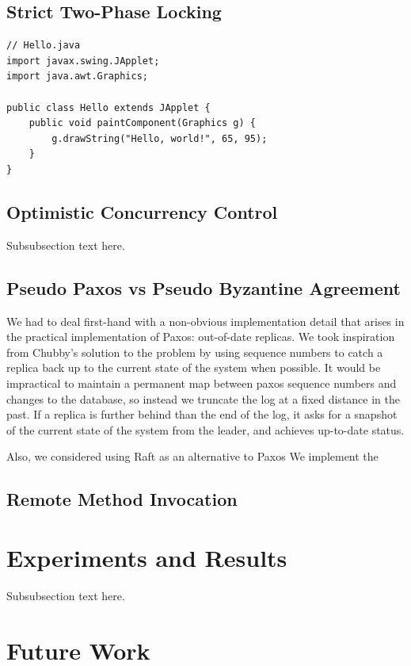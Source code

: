 \documentclass[10pt,twocolumn]{article}
\begin{document}
\subsection{Strict Two-Phase Locking}
\begin{lstlisting}
// Hello.java
import javax.swing.JApplet;
import java.awt.Graphics;

public class Hello extends JApplet {
    public void paintComponent(Graphics g) {
        g.drawString("Hello, world!", 65, 95);
    }    
}
\end{lstlisting}

\subsection{Optimistic Concurrency Control}
Subsubsection text here.

\subsection{Pseudo Paxos vs Pseudo Byzantine Agreement}

We had to deal first-hand with a non-obvious implementation detail that arises in the practical implementation of Paxos: out-of-date replicas. We took inspiration from Chubby's solution to the problem  \cite{chandra_paxos_2007} by using sequence numbers to catch a replica back up to the current state of the system when possible. It would be impractical to maintain a permanent map between paxos sequence numbers and changes to the database, so instead we truncate the log at a fixed distance in the past. If a replica is further behind than the end of the log, it asks for a snapshot of the current state of the system from the leader, and achieves up-to-date status.
  
Also, we considered using Raft \cite{ongaro_search_2014} as an alternative to Paxos
We implement the 

\subsection{Remote Method Invocation}

\section{Experiments and Results}
Subsubsection text here.

\section{Future Work}
\end{document}
